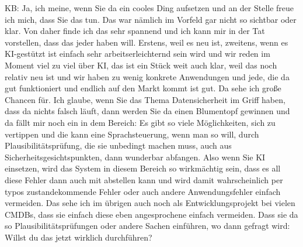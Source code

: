 \begin{list}{X:}{\setlength{\labelsep}{5mm}}
\item[KB:] Ja, ich meine, wenn Sie da ein cooles Ding aufsetzen und an der Stelle freue ich mich, dass Sie das tun. Das war nämlich im Vorfeld gar nicht so sichtbar oder klar. Von daher finde ich das sehr spannend und ich kann mir in der Tat vorstellen, dass das jeder haben will. Erstens, weil es neu ist, zweitens, wenn es KI-gestützt ist einfach sehr arbeitserleichternd sein wird und wir reden im Moment viel zu viel über KI, das ist ein Stück weit auch klar, weil das noch relativ neu ist und wir haben zu wenig konkrete Anwendungen und jede, die da gut funktioniert und endlich auf den Markt kommt ist gut. Da sehe ich große Chancen für. Ich glaube, wenn Sie das Thema Datensicherheit im Griff haben, dass da nichts falsch läuft, dann werden Sie da einen Blumentopf gewinnen und da fällt mir noch ein in dem Bereich: Es gibt so viele Möglichkeiten, sich zu vertippen und die kann eine Sprachsteuerung, wenn man so will, durch Plausibilitätsprüfung, die sie unbedingt machen muss, auch aus Sicherheitsgesichtspunkten, dann wunderbar abfangen. Also wenn Sie KI einsetzen, wird das System in diesem Bereich so wirkmächtig sein, dass es all diese Fehler dann auch mit abstellen kann und wird damit wahrscheinlich per typos zustandekommende Fehler oder auch andere Anwendungsfehler einfach vermeiden. Das sehe ich im übrigen auch noch als Entwicklungsprojekt bei vielen CMDBs, dass sie einfach diese eben angesprochene einfach vermeiden. Dass sie da so Plausibilitätsprüfungen oder andere Sachen einführen, wo dann gefragt wird: Willst du das jetzt wirklich durchführen?  
\end{list}
